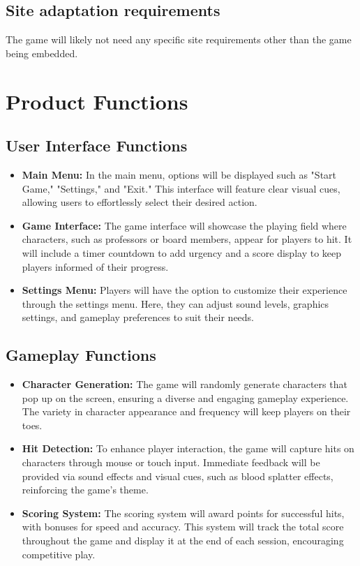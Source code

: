 \documentclass{article}
\begin{document}
\subsection{Site adaptation requirements}
The game will likely not need any specific site requirements other than the game being embedded.

\newpage
\section{Product Functions}
\subsection{User Interface Functions}
\begin{itemize}
    \item \textbf{Main Menu:} In the main menu, options will be displayed such as "Start Game," "Settings," and "Exit." This interface will feature clear visual cues, allowing users to effortlessly select their desired action.
    \item \textbf{Game Interface:} The game interface will showcase the playing field where characters, such as professors or board members, appear for players to hit. It will include a timer countdown to add urgency and a score display to keep players informed of their progress.
    \item \textbf{Settings Menu:} Players will have the option to customize their experience through the settings menu. Here, they can adjust sound levels, graphics settings, and gameplay preferences to suit their needs.
\end{itemize}

\subsection{Gameplay Functions}
\begin{itemize}
    \item \textbf{Character Generation:} The game will randomly generate characters that pop up on the screen, ensuring a diverse and engaging gameplay experience. The variety in character appearance and frequency will keep players on their toes.
    \item \textbf{Hit Detection:} To enhance player interaction, the game will capture hits on characters through mouse or touch input. Immediate feedback will be provided via sound effects and visual cues, such as blood splatter effects, reinforcing the game's theme.
    \item \textbf{Scoring System:} The scoring system will award points for successful hits, with bonuses for speed and accuracy. This system will track the total score throughout the game and display it at the end of each session, encouraging competitive play.
\end{itemize}
\end{document}
